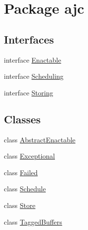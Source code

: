 \hypertarget{package__ajc}{
\section{Package ajc}
\label{package__ajc}
}
\subsection*{Interfaces}
\begin{CompactItemize}
\item 
interface \hyperlink{interfaceEnactable}{Enactable}
\item 
interface \hyperlink{interfaceScheduling}{Scheduling}
\item 
interface \hyperlink{interfaceStoring}{Storing}
\end{CompactItemize}
\subsection*{Classes}
\begin{CompactItemize}
\item 
class \hyperlink{classAbstractEnactable}{Abstract\-Enactable}
\item 
class \hyperlink{classExceptional}{Exceptional}
\item 
class \hyperlink{classFailed}{Failed}
\item 
class \hyperlink{classSchedule}{Schedule}
\item 
class \hyperlink{classStore}{Store}
\item 
class \hyperlink{classTaggedBuffers}{Tagged\-Buffers}
\end{CompactItemize}
